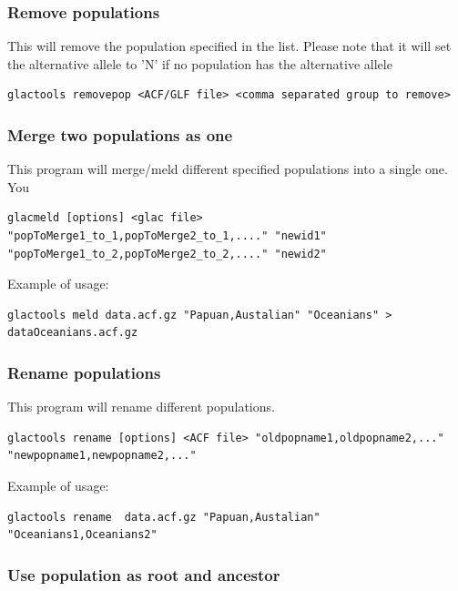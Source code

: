 \documentclass[a4paper]{article}
\begin{document}
\subsubsection{Remove populations}

\noindent This will remove the population specified in the list. Please note that it will set the alternative allele to 'N' if no population has the alternative allele

\begin{lstlisting}
glactools removepop <ACF/GLF file> <comma separated group to remove>
\end{lstlisting}



\subsubsection{Merge two populations as one}

\noindent This program will merge/meld different specified populations into a single one. You 

\small
\begin{lstlisting}
glacmeld [options] <glac file> "popToMerge1_to_1,popToMerge2_to_1,...." "newid1" "popToMerge1_to_2,popToMerge2_to_2,...." "newid2"
\end{lstlisting}
\normalsize

Example of usage:
\small
\begin{lstlisting}
glactools meld data.acf.gz "Papuan,Austalian" "Oceanians" > dataOceanians.acf.gz
\end{lstlisting}
\normalsize

\subsubsection{Rename populations}

\noindent This program will rename different populations.

\small
\begin{lstlisting}
glactools rename [options] <ACF file> "oldpopname1,oldpopname2,..." "newpopname1,newpopname2,..."  
\end{lstlisting}
\normalsize

Example of usage:
\begin{lstlisting}
glactools rename  data.acf.gz "Papuan,Austalian" "Oceanians1,Oceanians2"
\end{lstlisting}



\subsubsection{Use population as root and ancestor}
\end{document}

